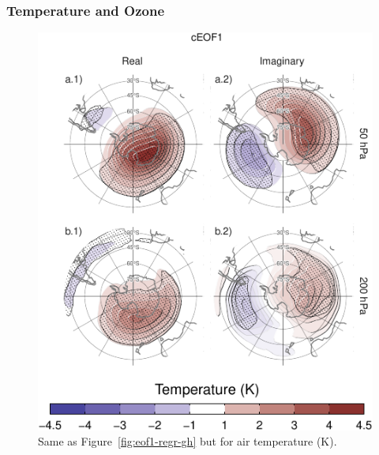 \documentclass[smallextended]{svjour3}       %
\begin{document}
\hypertarget{temp-ozone}{%
\subsubsection{Temperature and Ozone}\label{temp-ozone}}



\begin{figure}
\centering
\includegraphics{../figures/eof1-regr-t-1.pdf}
\caption{\label{fig:eof1-regr-t}Same as Figure~\ref{fig:eof1-regr-gh} but for air temperature (K).}
\end{figure}
\end{document}
